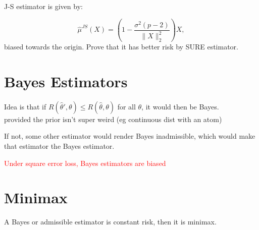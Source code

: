 \documentclass{article}
\newcommand\myworries[1]{\textcolor{red}{#1}}
\begin{document}
J-S estimator is given by:

$$\hat \mu^{JS} (X) = \left ( 1-\frac{\sigma^2(p-2)}{\|X\|_2^2}\right)X,$$
biased towards the origin. Prove that it has better risk by SURE estimator. 

\section{Bayes Estimators}
\begin{fact}
Idea is that if $R(\hat \theta ' ,\theta) \leq R(\hat \theta , \theta)$ for all $\theta$, it would then be Bayes. \\ provided the prior isn't super weird (eg continuous dist with an atom) 

\end{fact}

\begin{fact}
If not, some other estimator would render Bayes inadmissible, which would make that estimator the Bayes estimator.
\end{fact}

\begin{fact}
\myworries{Under square error loss, Bayes estimators are biased }
\end{fact}

\section{Minimax}
A Bayes or admissible estimator is constant risk, then it is minimax. 
\end{document}
